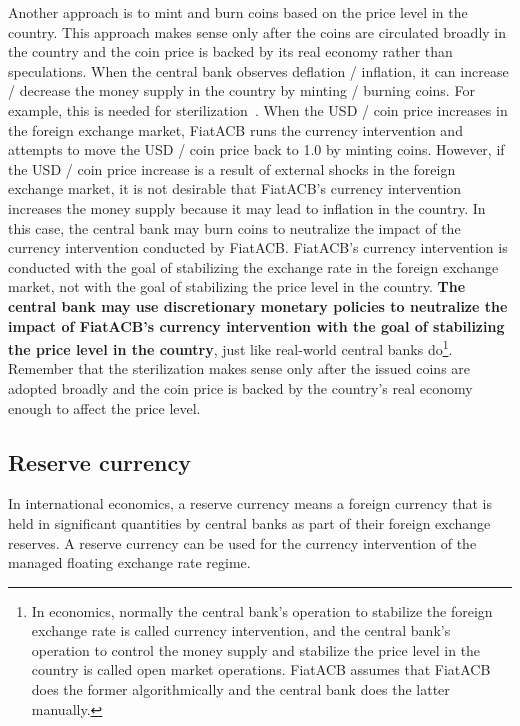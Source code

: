 \documentclass[dvipdfmx,a4paper]{article}
\begin{document}
Another approach is to mint and burn coins based on the price level in the country. This approach makes sense only after the coins are circulated broadly in the country and the coin price is backed by its real economy rather than speculations. When the central bank observes deflation / inflation, it can increase / decrease the money supply in the country by minting / burning coins. For example, this is needed for sterilization~\cite{aizenman2009sterilization}. When the USD / coin price increases in the foreign exchange market, FiatACB runs the currency intervention and attempts to move the USD / coin price back to 1.0 by minting coins. However, if the USD / coin price increase is a result of external shocks in the foreign exchange market, it is not desirable that FiatACB's currency intervention increases the money supply because it may lead to inflation in the country. In this case, the central bank may burn coins to neutralize the impact of the currency intervention conducted by FiatACB. FiatACB's currency intervention is conducted with the goal of stabilizing the exchange rate in the foreign exchange market, not with the goal of stabilizing the price level in the country. \textbf{The central bank may use discretionary monetary policies to neutralize the impact of FiatACB's currency intervention with the goal of stabilizing the price level in the country}, just like real-world central banks do\footnote{In economics, normally the central bank's operation to stabilize the foreign exchange rate is called currency intervention, and the central bank's operation to control the money supply and stabilize the price level in the country is called open market operations. FiatACB assumes that FiatACB does the former algorithmically and the central bank does the latter manually.}. Remember that the sterilization makes sense only after the issued coins are adopted broadly and the coin price is backed by the country's real economy enough to affect the price level.

\subsection{Reserve currency}

In international economics, a reserve currency means a foreign currency that is held in significant quantities by central banks as part of their foreign exchange reserves. A reserve currency can be used for the currency intervention of the managed floating exchange rate regime.
\end{document}
